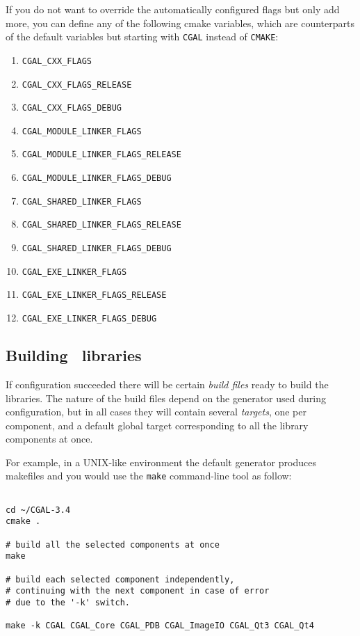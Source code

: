 If you do not want to override the automatically configured flags but only add more, you can 
define any of the following cmake variables, which are counterparts of the default
variables but starting with {\tt CGAL} instead of {\tt CMAKE}:

\begin{enumerate}
\item {\tt CGAL\_CXX\_FLAGS}
\item {\tt CGAL\_CXX\_FLAGS\_RELEASE}
\item {\tt CGAL\_CXX\_FLAGS\_DEBUG}
\item {\tt CGAL\_MODULE\_LINKER\_FLAGS}
\item {\tt CGAL\_MODULE\_LINKER\_FLAGS\_RELEASE}
\item {\tt CGAL\_MODULE\_LINKER\_FLAGS\_DEBUG}
\item {\tt CGAL\_SHARED\_LINKER\_FLAGS}
\item {\tt CGAL\_SHARED\_LINKER\_FLAGS\_RELEASE}
\item {\tt CGAL\_SHARED\_LINKER\_FLAGS\_DEBUG}
\item {\tt CGAL\_EXE\_LINKER\_FLAGS}
\item {\tt CGAL\_EXE\_LINKER\_FLAGS\_RELEASE}
\item {\tt CGAL\_EXE\_LINKER\_FLAGS\_DEBUG}
\end{enumerate}


\subsection{Building \cgal\ libraries}

If configuration succeeded there will be certain {\em build files} ready to build the libraries.
The nature of the build files depend on the generator used during configuration, but in all cases they 
will contain several {\em targets}, one per component,  and a default global target corresponding 
to all the library components at once.

For example, in a UNIX-like environment the default generator produces makefiles and you would
use the {\tt make} command-line tool as follow:

{\ccTexHtml{\scriptsize}{}
\begin{verbatim}

cd ~/CGAL-3.4
cmake .

# build all the selected components at once
make 

# build each selected component independently,
# continuing with the next component in case of error
# due to the '-k' switch.

make -k CGAL CGAL_Core CGAL_PDB CGAL_ImageIO CGAL_Qt3 CGAL_Qt4

\end{verbatim}
}

